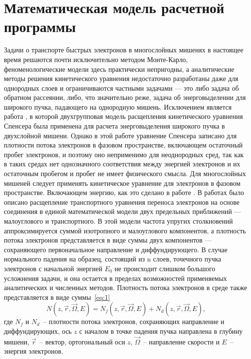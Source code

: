 \chapter{Математическая модель расчетной программы}
Задачи о транспорте быстрых электронов в многослойных мишенях в настоящее
время решаются почти исключительно методом Монте-Карло, феноменологические
модели здесь практически непригодны, а аналитические методы решения кинетического
уравнения недостаточно разработаны даже для однородных слоев и ограничиваются
частными задачами — это либо задача об обратном рассеянии, либо, что значительно
реже, задача об энерговыделении для широкого пучка, падающего на однородную
мишень. Исключением является работа \cite{zheng-ming}, в которой двухгрупповая
модель расщепления кинетического уравнения Спенсера была применена для расчета
энерговыделения широкого пучка в двухслойной мишени. Однако в этой работе
уравнение Спенсера записано для плотности потока электронов в фазовом пространстве,
включающем остаточный пробег электронов, и поэтому оно неприменимо для
неоднородных сред, так как в таких средах нет однозначного соответствия между
энергией электронов и их остаточным пробегом и пробег не имеет физического смысла.
Для многослойных мишеней следует применять кинетическое уравнение для электронов в
фазовом пространстве. Включающем энергию, как это сделано в работе \cite{smolar}.
В работах \cite{mikheev,smolar1,smolar2} было описано расщепление транспортного
уравнения переноса электронов на основе соединения в единой математической модели
двух предельных приближений — малоуглового и транспортного. В этой модели частота
упругих столкновений аппроксимируется суммой изотропного и малоуглового
компонентов, а плотность потока электронов представляется в виде суммы двух
компонентов — сохраняющего первоначальное направление и диффундирующего.
В случае нормального падения на образец, состоящий из n слоев, точечного пучка
электронов с начальной энергией $E_0$ не происходит слишком большого усложнения
задачи, и она остается в пределах возможностей применяемых аналитических и
численных методов. Плотность потока электронов в среде также представляется в виде
суммы~\ref{eq:1}
\begin{equation}
N(z,\vec{r},\vec{\Omega},E)=N_f (z,\vec{r},\vec{\Omega},E)+N_d (z,\vec{r},\vec{\Omega},E),
\label{eq:1}
\end{equation}
где $N_f$ и $N_d$~-- плотности потока электронов, сохраняющих направление и
диффундирующих, ось $z$ с началом в точке падения пучка направлена в глубину мишени,
$\vec{r}$~-- вектор, ортогональный оси $z$, $\vec{\Omega}$~-- направление скорости и $E$~-- энергия электронов.
